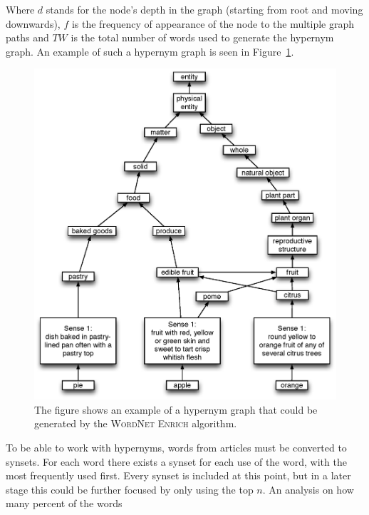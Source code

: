 Where $d$ stands for the node's depth in the graph (starting from root and moving downwards), $f$ is the frequency of appearance of the node to the multiple graph paths and $TW$ is the total number of words used to generate the hypernym graph. An example of such a hypernym graph is seen in Figure~\ref{fig:hypernym-graph}.
\begin{figure}[h!tp]
	\myfloatalign
		\includegraphics[width=.8\textwidth]{img/hypernym-graph}
			\caption{The figure shows an example of a hypernym graph that could be generated by the \textsc{WordNet Enrich} algorithm.}
			\label{fig:hypernym-graph}
\end{figure}


To be able to work with hypernyms, words from articles must be converted to synsets. For each word there exists a synset for each use of the word, with the most frequently used first. Every synset is included at this point, but in a later stage this could be further focused by only using the top $n$. An analysis on how many percent of the words



